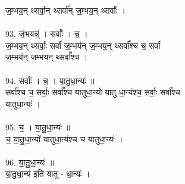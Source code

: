 ज॒म्भय॒न् थ्सर्वा॒न् थ्सर्वा᳚न् ज॒म्भय॒न् थ्सर्वाः᳚ ।\\
\\
93. जं॒भयन्न्॑ । सर्वाः᳚ । च॒ ।\\
ज॒म्भय॒न् थ्सर्वाः॒ सर्वा॑ ज॒म्भय॑न् ज॒म्भय॒न् थ्सर्वा᳚श्च च॒ सर्वा॑\\
ज॒म्भय॑न् ज॒म्भय॒न् थ्सर्वा᳚श्च ।\\
\\
94. सर्वाः᳚ । च॒ । या॒तु॒धा॒न्यः॑ ॥\\
सर्वा᳚श्च च॒ सर्वाः॒ सर्वा᳚श्च यातुधा॒न्यो॑ यातु धा॒न्य॑श्च॒ सर्वाः॒ सर्वा᳚श्च\\
यातुधा॒न्यः॑ ।\\
\\
95. च॒ । या॒तु॒धा॒न्यः॑ ॥\\
च॒ या॒तु॒धा॒न्यो॑ यातुधा॒न्य॑श्च च यातुधा॒न्यः॑ ।\\
\\
96. या॒तु॒धा॒न्यः॑ ॥\\
या॒तु॒धा॒न्य॑ इति॑ यातु - धा॒न्यः॑ ।\\
\\
